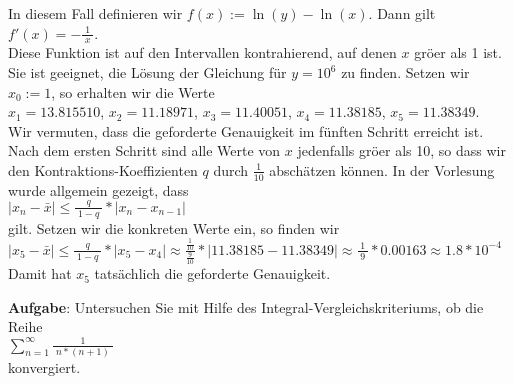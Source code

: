 \documentclass{article}
\newcommand{\bruch}[2]{\displaystyle\frac{\;\displaystyle#1\;}{\;\displaystyle#2\;}}
\begin{document}
\begin{enumerate}
      In diesem Fall definieren wir $f(x) := \ln(y) - \ln(x)$.  Dann gilt 
      \\[0.1cm]
      \hspace*{1.3cm}
      $f'(x) = -\bruch{1}{x}$.
      \\[0.1cm]
      Diese Funktion ist auf den Intervallen kontrahierend, auf denen $x$ gr\"o\3er als 1
      ist. Sie ist geeignet, die L\"osung der Gleichung f\"ur $y= 10^6$ zu finden. 
      Setzen wir $x_0 := 1$, so erhalten wir die Werte 
      \\[0.1cm]
      \hspace*{0.3cm}
      $x_1 = 13.815510$, \quad $x_2 = 11.18971$, \quad $x_3 = 11.40051$, \quad
      $x_4 = 11.38185$, \quad $x_5 = 11.38349$.
      \\[0.1cm]
      Wir vermuten, dass die geforderte Genauigkeit im f\"unften Schritt erreicht ist.  Nach
      dem ersten Schritt sind alle Werte von $x$ jedenfalls gr\"o\3er als 10, so dass wir den
      Kontraktions-Koeffizienten $q$ durch $\frac{1}{10}$ absch\"atzen k\"onnen. In der Vorlesung
      wurde allgemein gezeigt, dass 
      \\[0.1cm]
      \hspace*{1.3cm}
      $|x_{n} - \bar{x}| \leq \bruch{q}{1-q}*|x_n - x_{n-1}|$
      \\[0.1cm] gilt. Setzen wir die konkreten Werte ein, so finden wir
      \\[0.1cm]
      \hspace*{0.3cm}
      $|x_5 - \bar{x}| \leq \bruch{q}{1-q} * |x_5 - x_4| \approx
      \frac{\frac{1}{10}}{\frac{9}{10}}*|11.38185 - 11.38349| \approx
      \bruch{1}{9}*0.00163 \approx 1.8*10^{-4}$
      \\[0.1cm]
      Damit hat $x_5$ tats\"achlich die geforderte Genauigkeit.
\end{enumerate}
\pagebreak

\noindent
\textbf{Aufgabe}: Untersuchen Sie mit Hilfe des Integral-Vergleichskriteriums, ob die
Reihe 
\\[0.1cm]
\hspace*{1.3cm}
$\displaystyle \sum\limits_{n=1}^\infty \bruch{1}{n*(n+1)}$ 
\\[0.3cm]
konvergiert.
\vspace*{0.1cm}
\end{document}
